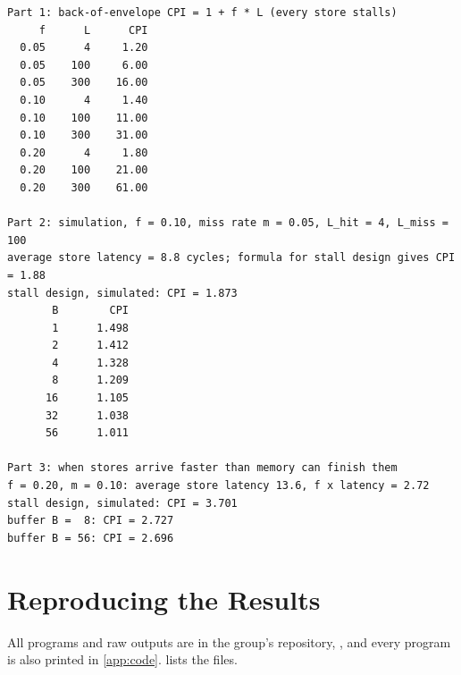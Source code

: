 \begin{lstlisting}[style=vscode,numbers=none,basicstyle=\ttfamily\scriptsize\color{vsfg}]
Part 1: back-of-envelope CPI = 1 + f * L (every store stalls)
     f      L      CPI
  0.05      4     1.20
  0.05    100     6.00
  0.05    300    16.00
  0.10      4     1.40
  0.10    100    11.00
  0.10    300    31.00
  0.20      4     1.80
  0.20    100    21.00
  0.20    300    61.00

Part 2: simulation, f = 0.10, miss rate m = 0.05, L_hit = 4, L_miss = 100
average store latency = 8.8 cycles; formula for stall design gives CPI = 1.88
stall design, simulated: CPI = 1.873
       B        CPI
       1      1.498
       2      1.412
       4      1.328
       8      1.209
      16      1.105
      32      1.038
      56      1.011

Part 3: when stores arrive faster than memory can finish them
f = 0.20, m = 0.10: average store latency 13.6, f x latency = 2.72
stall design, simulated: CPI = 3.701
buffer B =  8: CPI = 2.727
buffer B = 56: CPI = 2.696
\end{lstlisting}

\chapter{Reproducing the Results}
\label{app:repro}

All programs and raw outputs are in the group's repository, \repourl, and every program is also printed in \cref{app:code}.  lists the files.

